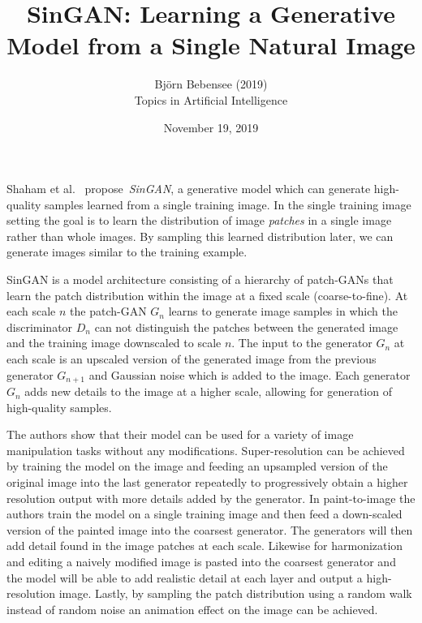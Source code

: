 \documentclass[12pt]{article}
\begin{document}
 
 
\title{SinGAN: Learning a Generative Model from a Single Natural Image}
\author{Bj\"orn Bebensee (2019)\\ %
Topics in Artificial Intelligence}
\date{November 19, 2019}
\maketitle

\noindent
Shaham et al.~\cite{shaham} propose~\emph{SinGAN}, a generative model which can generate high-quality samples learned from a single training image. In the single training image setting the goal is to learn the distribution of image \emph{patches} in a single image rather than whole images. By sampling this learned distribution later, we can generate images similar to the training example.

SinGAN is a model architecture consisting of a hierarchy of patch-GANs that learn the patch distribution within the image at a fixed scale (coarse-to-fine). At each scale $n$ the patch-GAN $G_n$ learns to generate image samples in which the discriminator $D_n$ can not distinguish the patches between the generated image and the training image downscaled to scale $n$. The input to the generator $G_n$ at each scale is an upscaled version of the generated image from the previous generator $G_{n+1}$ and Gaussian noise which is added to the image. Each generator $G_n$ adds new details to the image at a higher scale, allowing for generation of high-quality samples.

The authors show that their model can be used for a variety of image manipulation tasks without any modifications. Super-resolution can be achieved by training the model on the image and feeding an upsampled version of the original image into the last generator repeatedly to progressively obtain a higher resolution output with more details added by the generator. In paint-to-image the authors train the model on a single training image and then feed a down-scaled version of the painted image into the coarsest generator. The generators will then add detail found in the image patches at each scale. Likewise for harmonization and editing a naively modified image is pasted into the coarsest generator and the model will be able to add realistic detail at each layer and output a high-resolution image. Lastly, by sampling the patch distribution using a random walk instead of random noise an animation effect on the image can be achieved.
\end{document}
